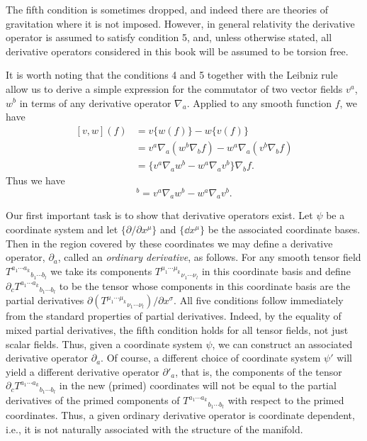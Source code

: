 The fifth condition is sometimes dropped, and indeed there are theories of gravitation where it is not imposed. However, in general relativity the derivative operator
is assumed to satisfy condition 5, and, unless otherwise stated, all derivative operators considered in this book will be assumed to be torsion free.

It is worth noting that the conditions 4 and 5 together with the Leibniz rule allow
us to derive a simple expression for the commutator of two vector fields $v^a$, $w^b$ in
terms of any derivative operator $\nabla_a$. Applied to any smooth function $f$, we have
\begin{equation}
  \begin{aligned}
    [v,w](f)
    &=v\{w(f)\}-w\{v(f)\}\\
    &=v^a\nabla_a(w^b\nabla_bf)-w^a\nabla_a(v^b\nabla_bf)\\
    &=\bigl\{v^a\nabla_aw^b-w^a\nabla_av^b\bigr\}\nabla_bf.
  \end{aligned}
  \tag{3.1.1}\label{eq:3.1.1}
\end{equation}
Thus we have
\begin{equation}
  [v,w]^b=v^a\nabla_aw^b-w^a\nabla_av^b.
  \tag{3.1.2}\label{eq:3.1.2}
\end{equation}

Our first important task is to show that derivative operators exist. Let $\psi$ be a
coordinate system and let $\{\partial/\partial x^\mu\}$ and $\{\dd x^\mu\}$ be the associated coordinate
bases. Then in the region covered by these coordinates we may define a derivative operator,
$\partial_a$, called an \emph{ordinary derivative}, as follows. For any smooth tensor field
$T^{a_1\cdots a_k}{}_{b_1\cdots b_l}$ we take its components
$T^{\mu_1\cdots\mu_k}{}_{\nu_1\cdots\nu_l}$ in this coordinate basis and define
$\partial_cT^{a_1\cdots a_k}{}_{b_1\cdots b_l}$ to be the tensor whose components in this coordinate basis are the
partial derivatives $\partial(T^{\mu_1\cdots\mu_k}{}_{\nu_1\cdots\nu_l})/\partial x^\sigma$. All five conditions follow immediately from
the standard properties of partial derivatives. Indeed, by the equality of mixed partial
derivatives, the fifth condition holds for all tensor fields, not just scalar fields. Thus,
given a coordinate system $\psi$, we can construct an associated derivative operator $\partial_a$.
Of course, a different choice of coordinate system $\psi'$ will yield a different derivative
operator $\partial'_a$, that is, the components of the tensor
$\partial_cT^{a_1\cdots a_k}{}_{b_1\cdots b_l}$ in the new (primed)
coordinates will not be equal to the partial derivatives of the primed components of
$T^{a_1\cdots a_k}{}_{b_1\cdots b_l}$ with respect to the primed coordinates. Thus, a given ordinary derivative
operator is coordinate dependent, i.e., it is not naturally associated with the structure
of the manifold.

